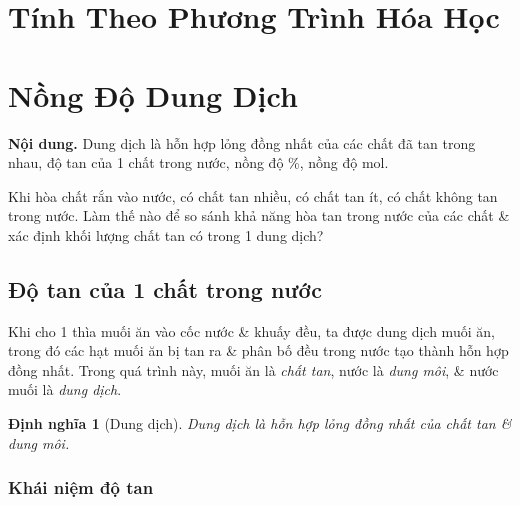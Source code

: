 \documentclass{article}
\newtheorem{dinhnghia}{Định nghĩa}
\begin{document}

\section{Tính Theo Phương Trình Hóa Học}

\noindent{}


\section{Nồng Độ Dung Dịch}
\textsf{\textbf{Nội dung.} Dung dịch là hỗn hợp lỏng đồng nhất của các chất đã tan trong nhau, độ tan của 1 chất trong nước, nồng độ \%, nồng độ mol.}

Khi hòa chất rắn vào nước, có chất tan nhiều, có chất tan ít, có chất không tan trong nước. Làm thế nào để so sánh khả năng hòa tan trong nước của các chất \& xác định khối lượng chất tan có trong 1 dung dịch?

\subsection{Độ tan của 1 chất trong nước}
Khi cho 1 thìa muối ăn vào cốc nước \& khuấy đều, ta được dung dịch muối ăn, trong đó các hạt muối ăn bị tan ra \& phân bố đều trong nước tạo thành hỗn hợp đồng nhất. Trong quá trình này, muối ăn là \textit{chất tan}, nước là \textit{dung môi}, \& nước muối là \textit{dung dịch}.

\begin{dinhnghia}[Dung dịch]
	\emph{Dung dịch} là hỗn hợp lỏng đồng nhất của chất tan \& dung môi.
\end{dinhnghia}

\subsubsection{Khái niệm độ tan}
\end{document}
